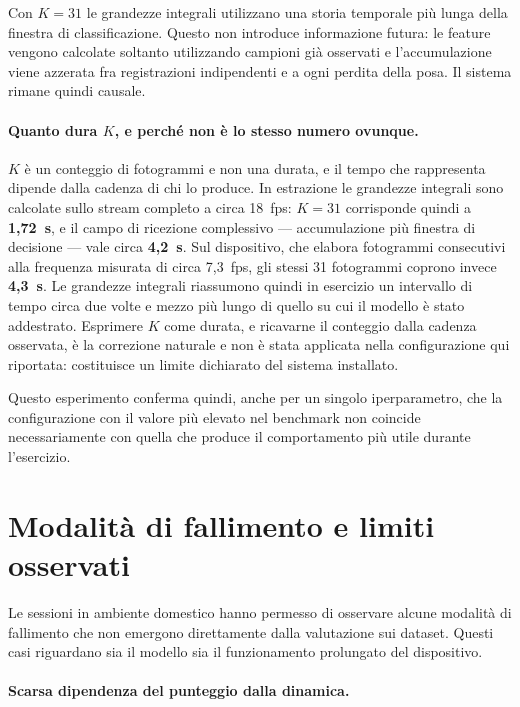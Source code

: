 Con $K=31$ le grandezze integrali utilizzano una storia temporale più lunga della finestra di classificazione. Questo non introduce informazione futura: le feature vengono calcolate soltanto utilizzando campioni già osservati e l'accumulazione viene azzerata fra registrazioni indipendenti e a ogni perdita della posa. Il sistema rimane quindi causale.

\paragraph{Quanto dura $K$, e perché non è lo stesso numero ovunque.} $K$ è un conteggio di fotogrammi e non una durata, e il tempo che rappresenta dipende dalla cadenza di chi lo produce. In estrazione le grandezze integrali sono calcolate sullo stream completo a circa 18~fps: $K=31$ corrisponde quindi a \textbf{1,72~s}, e il campo di ricezione complessivo --- accumulazione più finestra di decisione --- vale circa \textbf{4,2~s}. Sul dispositivo, che elabora fotogrammi consecutivi alla frequenza misurata di circa 7,3~fps, gli stessi 31 fotogrammi coprono invece \textbf{4,3~s}. Le grandezze integrali riassumono quindi in esercizio un intervallo di tempo circa due volte e mezzo più lungo di quello su cui il modello è stato addestrato. Esprimere $K$ come durata, e ricavarne il conteggio dalla cadenza osservata, è la correzione naturale e non è stata applicata nella configurazione qui riportata: costituisce un limite dichiarato del sistema installato.

Questo esperimento conferma quindi, anche per un singolo iperparametro, che la configurazione con il valore più elevato nel benchmark non coincide necessariamente con quella che produce il comportamento più utile durante l'esercizio.

\section{Modalità di fallimento e limiti osservati}
\label{sec:modi-fallire}
\label{sec:limiti-operativi}

Le sessioni in ambiente domestico hanno permesso di osservare alcune modalità di fallimento che non emergono direttamente dalla valutazione sui dataset. Questi casi riguardano sia il modello sia il funzionamento prolungato del dispositivo.

\paragraph{Scarsa dipendenza del punteggio dalla dinamica.}

